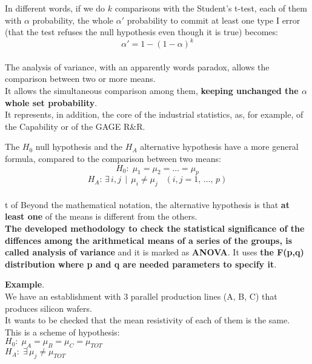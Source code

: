 \begin{frame}
  \vspace*{.25cm}
  In different words, if we do $ k $ comparisons with the Student's t-test, each of them with $ \alpha $ probability, the whole $ \alpha' $ probability to commit at least one type I error (that the test refuses the null hypothesis even though it is true) becomes:
  $$ \alpha' = 1 - (1 - \alpha)^k $$\\
  \vspace*{.25cm}
  The analysis of variance, with an apparently words paradox, allows the comparison between two or more means.\\
  It allows the simultaneous comparison among them, \textbf{keeping unchanged the {\boldmath $ \alpha $} whole set probability}.\\
  \vspace*{.25cm}
  It represents, in addition, the core of the industrial statistics, as, for example, of the Capability or of the GAGE R\&R.
\end{frame}

\begin{frame}
  \vspace*{.25cm}
  The $ H_0 $ null hypothesis and the $ H_A $ alternative hypothesis have a more general formula, compared to the comparison between two means: \\
  \vspace*{.15cm}
  {\boldmath $$ H_0: \; \mu_1= \mu_2 = \dots = \mu_p $$}
  {\boldmath $$ H_A: \, \exists \, i,j \,\mid\,\mu_i\neq\mu_j\;\;\;(i,j=1,\,\dots,\,p)$$}\\
  \vspace*{.15cm}t of 
  Beyond the mathematical notation, the alternative hypothesis is that \textbf{at least one} of the means is different from the others.\\
  \textbf{The developed methodology to check the statistical significance of the diffences among the arithmetical means of a series of the groups, is called analysis of variance} and it is marked as \textbf{ANOVA}. It uses \textbf{the F(p,q) distribution where p and q are needed parameters to specify it}.
\end{frame}

\begin{frame}
  \vspace*{.25cm}
  \textbf{Example}. \\
  \vspace*{.15cm}
  We have an establishment with 3 parallel production lines (A, B, C) that produces silicon wafers.\\
  It wants to be checked that the mean resistivity of each of them is the same.\\
  \vspace*{.75cm}
  This is a scheme of hypothesis:\\
  \hspace*{2cm}$H_0:\;\mu_A=\mu_B=\mu_C=\mu_{TOT}$\\
  \vspace*{.15cm}
  \hspace*{2cm}$H_A:\;\exists\,\mu_j \ne \mu_{TOT}$
\end{frame}

